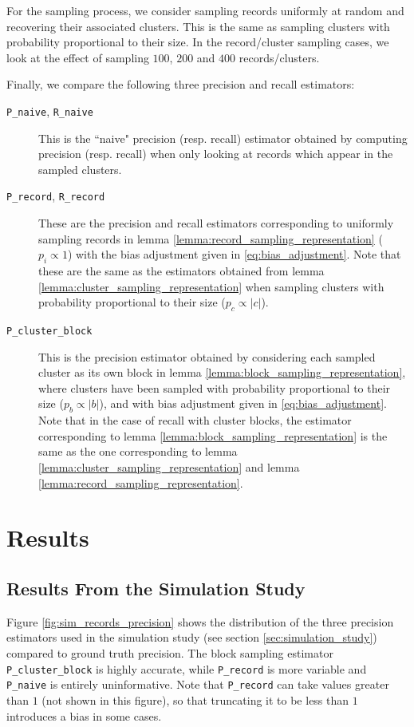 \documentclass[fontsize=11pt]{article}
\theoremstyle{definition}
\begin{document}
For the sampling process, we consider sampling records uniformly at random and recovering their associated clusters. This is the same as sampling clusters with probability proportional to their size. In the record/cluster sampling cases, we look at the effect of sampling $100$, $200$ and $400$ records/clusters.

Finally, we compare the following three precision and recall estimators:
\begin{description}
    \item[\texttt{P\_naive}, \texttt{R\_naive}] This is the ``naive" precision (resp. recall) estimator obtained by computing precision (resp. recall) when only looking at records which appear in the sampled clusters.
    \item[\texttt{P\_record}, \texttt{R\_record}] These are the precision and recall estimators corresponding to uniformly sampling records in lemma \ref{lemma:record_sampling_representation} ($p_i \propto 1$) with the bias adjustment given in \eqref{eq:bias_adjustment}. Note that these are the same as the estimators obtained from lemma \ref{lemma:cluster_sampling_representation} when sampling clusters with probability proportional to their size ($p_c \propto \lvert c \rvert$).
    \item[\texttt{P\_cluster\_block}] This is the precision estimator obtained by considering each sampled cluster as its own block in lemma \ref{lemma:block_sampling_representation}, where clusters have been sampled with probability proportional to their size ($p_b \propto \lvert b \rvert$), and with bias adjustment given in \eqref{eq:bias_adjustment}. Note that in the case of recall with cluster blocks, the estimator corresponding to lemma \ref{lemma:block_sampling_representation} is the same as the one corresponding to lemma \ref{lemma:cluster_sampling_representation} and lemma \ref{lemma:record_sampling_representation}.
\end{description}

\section{Results}\label{sec:results}

\subsection{Results From the Simulation Study}

Figure \ref{fig:sim_records_precision} shows the distribution of the three precision estimators used in the simulation study (see section \ref{sec:simulation_study}) compared to ground truth precision. The block sampling estimator \texttt{P\_cluster\_block} is highly accurate, while \texttt{P\_record} is more variable and \texttt{P\_naive} is entirely uninformative. Note that \texttt{P\_record} can take values greater than $1$ (not shown in this figure), so that truncating it to be less than $1$ introduces a bias in some cases.
\end{document}
